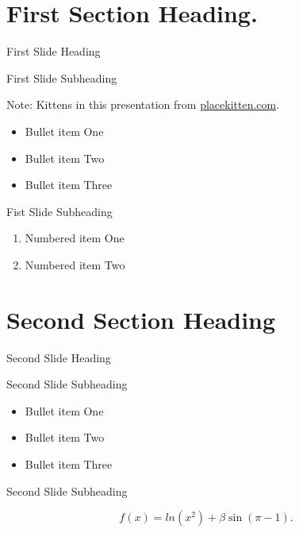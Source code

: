 \section{First Section Heading.}\label{first-section-heading.}

\begin{frame}{First Slide Heading}

\begin{block}{First Slide Subheading}

Note: Kittens in this presentation from
\href{http://placekitten.com/attribution.html}{placekitten.com}.

\begin{itemize}
\itemsep1pt\parskip0pt
\item
  Bullet item One
\item
  Bullet item Two
\item
  Bullet item Three
\end{itemize}

\end{block}

\begin{block}{Fist Slide Subheading}

\begin{enumerate}
\def\labelenumi{\arabic{enumi}.}
\itemsep1pt\parskip0pt
\item
  Numbered item One
\item
  Numbered item Two
\end{enumerate}

\end{block}

\end{frame}

\section{Second Section Heading}\label{second-section-heading}

\begin{frame}{Second Slide Heading}

\begin{block}{Second Slide Subheading}

\begin{itemize}
\itemsep1pt\parskip0pt
\item
  Bullet item One
\item
  Bullet item Two
\item
  Bullet item Three
\end{itemize}

\end{block}

\begin{block}{Second Slide Subheading}

\[ 
f(x) = ln(x^2) + \beta \sin( \pi - 1).
\]

\end{block}

\end{frame}

